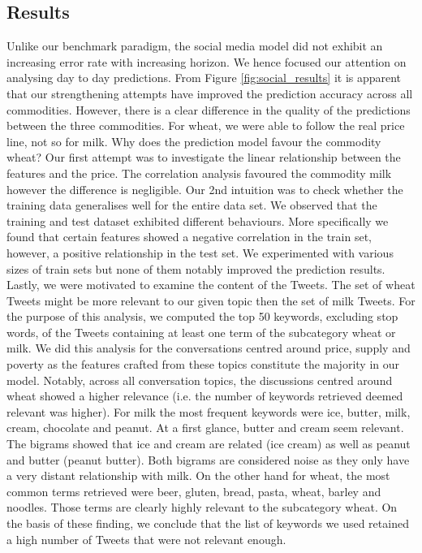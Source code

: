 \subsection{Results}
\label{result_m2}

Unlike our benchmark paradigm, the social media model did not exhibit an increasing error rate with increasing horizon. We hence focused our attention on analysing day to day predictions. From Figure \ref{fig:social_results} it is apparent that our strengthening attempts have improved the prediction accuracy across all commodities. However, there is a clear difference in the quality of the predictions between the three commodities. For wheat, we were able to follow the real price line, not so for milk. Why does the prediction model favour the commodity wheat? Our first attempt was to investigate the linear relationship between the features and the price. The correlation analysis favoured the commodity milk however the difference is negligible. Our 2nd intuition was to check whether the training data generalises well for the entire data set. We observed that the training and test dataset exhibited different behaviours. More specifically we found that certain features showed a negative correlation in the train set, however, a positive relationship in the test set. We experimented with various sizes of train sets but none of them notably improved the prediction results. Lastly, we were motivated to examine the content of the Tweets. The set of wheat Tweets might be more relevant to our given topic then the set of milk Tweets. For the purpose of this analysis, we computed the top 50 keywords, excluding stop words, of the Tweets containing at least one term of the subcategory wheat or milk. We did this analysis for the conversations centred around price, supply and poverty as the features crafted from these topics constitute the majority in our model. Notably, across all conversation topics, the discussions centred around wheat showed a higher relevance (i.e. the number of keywords retrieved  deemed relevant was higher). For milk the most frequent keywords were ice, butter,  milk, cream, chocolate and peanut. At a first glance, butter and cream seem relevant. The bigrams showed that ice and cream are related (ice cream) as well as peanut and butter (peanut butter). Both bigrams are considered noise as they only have a very distant relationship with milk. On the other hand for wheat, the most common terms retrieved were beer, gluten, bread, pasta, wheat, barley and noodles.  Those terms are clearly highly relevant to the subcategory wheat. On the basis of these finding, we conclude that the list of keywords we used retained a high number of Tweets that were not relevant enough. 





